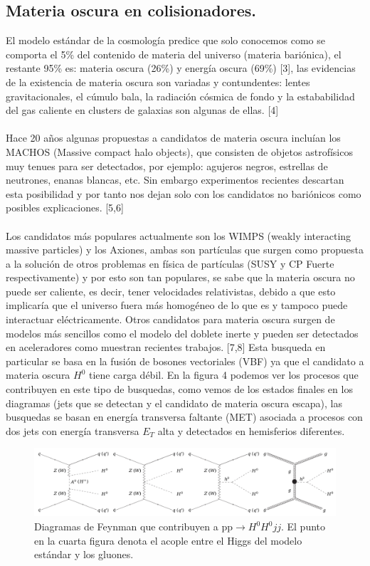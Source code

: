 \subsection{Materia oscura en colisionadores.}

El modelo estándar de la cosmología predice que solo conocemos como se comporta el 5\% del contenido de materia del universo (materia bariónica), el restante 95\% es: materia oscura (26\%) y energía oscura (69\%) [3], las evidencias de la existencia de materia oscura son variadas y contundentes: lentes gravitacionales, el cúmulo bala, la radiación cósmica de fondo y la estababilidad del gas caliente en clusters de galaxias son algunas de ellas. [4] 
\\
\\
Hace 20 años algunas propuestas a candidatos de materia oscura incluían los MACHOS (Massive compact halo objects), que consisten de objetos astrofísicos muy tenues para ser detectados, por ejemplo: agujeros negros, estrellas de neutrones, enanas blancas, etc. Sin embargo experimentos recientes descartan esta posibilidad y por tanto nos dejan solo con los candidatos no bariónicos como posibles explicaciones. [5,6]
\\
\\
Los candidatos más populares actualmente son los WIMPS (weakly interacting massive particles) y los Axiones, ambas son partículas que surgen como propuesta a la solución de otros problemas en física de partículas (SUSY y CP Fuerte respectivamente) y por esto son tan populares, se sabe que la materia oscura no puede ser caliente, es decir, tener velocidades relativistas, debido a que esto implicaría que el universo fuera más homogéneo de lo que es y tampoco puede interactuar eléctricamente. Otros candidatos para materia oscura surgen de modelos más sencillos como el modelo del doblete inerte y pueden ser detectados en aceleradores como muestran recientes trabajos. [7,8] Esta busqueda en particular se basa en la fusión de bosones vectoriales (VBF) ya que el candidato a materia oscura $H^0$ tiene carga débil. En la figura 4 podemos ver los procesos que contribuyen en este tipo de busquedas, como vemos de los estados finales en los diagramas (jets que se detectan y el candidato de materia oscura escapa), las busquedas se basan en energía transversa faltante (MET) asociada a procesos con dos jets con energía transversa $E_T$ alta y detectados en hemisferios diferentes.
\begin{figure}
	\centering
	\includegraphics[width=15cm]{F4.png}
	\caption{\label{fig:frog} Diagramas de Feynman que contribuyen a pp$\rightarrow H^0H^0 jj$. El punto en la cuarta figura denota el acople entre el Higgs del modelo estándar y los gluones.}
\end{figure}
